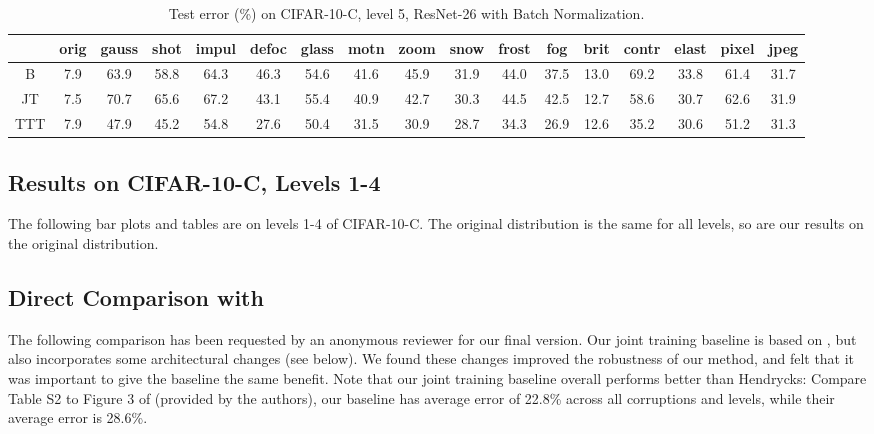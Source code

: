 \begin{table}[ht]
	\footnotesize
	\begin{center}
		{
			\setlength\tabcolsep{3.5pt}
			\begin{tabular}{c|c|c|c|c|c|c|c|c|c|c|c|c|c|c|c|c}
				\hline
				& orig& gauss& shot& impul& defoc& glass& motn& zoom& snow& frost& fog& brit& contr& elast& pixel& jpeg\\
				\hline
				B & 7.9& 63.9& 58.8& 64.3& 46.3& 54.6& 41.6& 45.9& 31.9& 44.0& 37.5& 13.0& 69.2& 33.8& 61.4& 31.7\\
				\hline
				JT & 7.5& 70.7& 65.6& 67.2& 43.1& 55.4& 40.9& 42.7& 30.3& 44.5& 42.5& 12.7& 58.6& 30.7& 62.6& 31.9\\
				\hline
				TTT & 7.9& 47.9& 45.2& 54.8& 27.6& 50.4& 31.5& 30.9& 28.7& 34.3& 26.9& 12.6& 35.2& 30.6& 51.2& 31.3\\
				\hline
			\end{tabular}
		}
	\end{center}
	\vspace{-2ex}
	\caption{
		Test error (\%) on CIFAR-10-C, level 5, ResNet-26 with Batch Normalization.
	}
	\label{table:bn}
\end{table} 

\subsection{Results on CIFAR-10-C, Levels 1-4}
The following bar plots and tables are on levels 1-4 of CIFAR-10-C.
The original distribution is the same for all levels, so are our results on the original distribution.

\subsection{Direct Comparison with \citet{hendrycks2019using}}
\label{reviewer_stuff}
The following comparison has been requested by an anonymous reviewer for our final version.
Our joint training baseline is based on \citet{hendrycks2019using}, but also incorporates some architectural changes (see below). We found these changes improved the robustness of our method, and felt that it was important to give the baseline the same benefit. Note that our joint training baseline overall performs better than Hendrycks: Compare Table S2 to Figure 3 of \citet{hendrycks2019using} (provided by the authors), our baseline has average error of 22.8\% across all corruptions and levels, while their average error is 28.6\%. 

